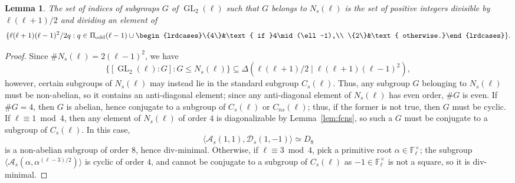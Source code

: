 \documentclass[table,dvipsnames]{amsart}
\newcommand{\F}{\mathbb{F}}
\newcommand{\GL}{\operatorname{GL}}
\newcommand{\angles}[1]{\langle #1\rangle}
\newcommand{\odd}{\mathrm{odd}}
\newtheorem{lemma}[theorem]{Lemma}
\numberwithin{equation}{section}
\newcommand{\s}{\textit{s}}
\newcommand{\ns}{\textit{ns}}
\newcommand{\Cs}{C_\s}
\newcommand{\Cns}{C_\ns}
\newcommand{\Ns}{N_\s}
\begin{document}
\begin{lemma}
\label{lem:fns}
The set of indices of subgroups $G$ of $\GL_2(\ell)$ such that $G$ belongs to $\Ns(\ell)$ is the set of positive integers divisible by $\ell(\ell+1)/2$ and dividing an element of
\begin{equation*}
\{\ell(\ell+1)(\ell-1)^2/2q:q\in\Pi_\odd(\ell-1)\cup\begin{lrdcases}\{4\}&\text{ if }4\mid(\ell-1),\\
\{2\}&\text{ otherwise.}\end{lrdcases}\}.
\end{equation*}
\end{lemma}
\begin{proof}
Since $\#\Ns(\ell)=2(\ell-1)^2$, we have
\begin{equation*}
\{[\GL_2(\ell):G]:G\le\Ns(\ell)\}\subseteq\Delta(\ell(\ell+1)/2\mid\ell(\ell+1)(\ell-1)^2),
\end{equation*}
however, certain subgroups of $\Ns(\ell)$ may instead lie in the standard subgroup $\Cs(\ell)$. Thus, any subgroup $G$ belonging to $\Ns(\ell)$ must be non-abelian, so it contains an anti-diagonal element; since any anti-diagonal element of $\Ns(\ell)$ has even order, $\#G$ is even. If $\#G=4$, then $G$ is abelian, hence conjugate to a subgroup of $\Cs(\ell)$ or $\Cns(\ell)$; thus, if the former is not true, then $G$ must be cyclic. If $\ell\equiv 1\bmod 4$, then any element of $\Ns(\ell)$ of order $4$ is diagonalizable by Lemma~\ref{lem:fcns}, so such a $G$ must be conjugate to a subgroup of $\Cs(\ell)$. In this case,
\begin{equation}
\label{eqn:d8}
\angles{\mathcal{A}_\s(1,1),\mathcal{D}_\s(1,-1)}\simeq D_8
\end{equation}
is a non-abelian subgroup of order $8$, hence div-minimal. Otherwise, if $\ell\equiv 3\bmod 4$, pick a primitive root $\alpha\in\F_\ell^\times$; the subgroup $\angles{\mathcal{A}_\s(\alpha,\alpha^{(\ell-3)/2})}$ is cyclic of order $4$, and cannot be conjugate to a subgroup of $\Cs(\ell)$ as $-1\in\F_\ell^\times$ is not a square, so it is div-minimal.


\end{proof}
\end{document}
